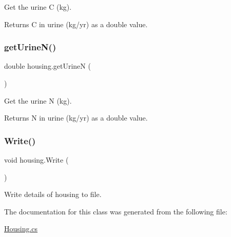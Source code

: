 Get the urine C (kg). 

\begin{DoxyReturn}{Returns}
C in urine (kg/yr) as a double value. 
\end{DoxyReturn}
\mbox{\label{classhousing_a9df8ddec2d15e3b64ad8819b03a71261}} 
\subsubsection{\texorpdfstring{getUrineN()}{getUrineN()}}
{\footnotesize\ttfamily double housing.\+get\+UrineN (\begin{DoxyParamCaption}{ }\end{DoxyParamCaption})\hspace{0.3cm}{\ttfamily [inline]}}



Get the urine N (kg). 

\begin{DoxyReturn}{Returns}
N in urine (kg/yr) as a double value. 
\end{DoxyReturn}
\mbox{\label{classhousing_a589942e33cabe72d088f1428d076d8ac}} 
\subsubsection{\texorpdfstring{Write()}{Write()}}
{\footnotesize\ttfamily void housing.\+Write (\begin{DoxyParamCaption}{ }\end{DoxyParamCaption})\hspace{0.3cm}{\ttfamily [inline]}}



Write details of housing to file. 



The documentation for this class was generated from the following file\+:\begin{DoxyCompactItemize}
\item 
\mbox{\hyperlink{_housing_8cs}{Housing.\+cs}}\end{DoxyCompactItemize}
